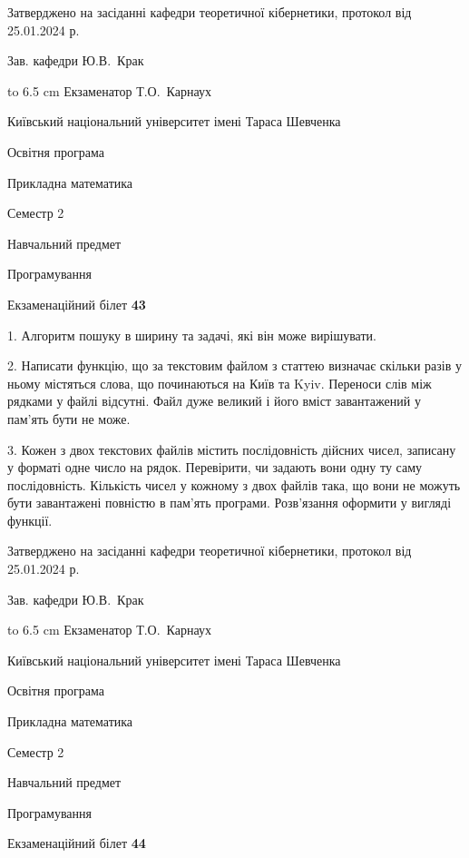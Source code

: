 \documentclass[12pt, ukrainian]{article}
\begin{document}
{\smallskip\smallskip \begin {scriptsize} Затверджено на засіданні кафедри теоретичної кібернетики, протокол   від   25.01.2024 р.\par\smallskip\smallskip\smallskip\smallskip
{\parbox {6.5 cm} {Зав. кафедри \dotfill Ю.В.~Крак}}\hspace {0.7cm} {\hbox to 6.5 cm { Екзаменатор \dotfill Т.О.~Карнаух}} \end{scriptsize}}
\newpage
{{\begin {scriptsize}\par
{ \center  Київський національний університет імені Тараса Шевченка \par}
{\parbox {5 cm}{Освітня програма \hfill}{\parbox {7 cm}{Прикладна математика\hfill}}\parbox {6 cm}{\hfill Семестр 2}}\par
{\parbox {5 cm} {Навчальний предмет \hfill}\parbox {7 cm}{Програмування \hfill}\parbox {6cm}{\hfill}\par}\vspace{-15pt} \end{scriptsize}}{\center Екзаменаційний білет \No \textbf { 43 }\par}}
{%
1. Алгоритм пошуку в ширину та задачі, які він може вирішувати.%
\par
2. Написати функцію, що за текстовим файлом з статтею визначає скільки разів у ньому містяться слова, що починаються на Київ та Kyiv.  Переноси слів між рядками у файлі відсутні. Файл дуже великий і його вміст завантажений у пам'ять бути не може.

\par
3. Кожен з двох текстових файлів містить послідовність дійсних чисел, записану у форматі одне число на рядок.  Перевірити, чи задають вони одну ту саму послідовність. Кількість чисел у кожному з двох файлів така, що вони не можуть бути завантажені повністю в пам'ять програми. Розв'язання оформити у вигляді функції.

}
{\smallskip\smallskip \begin {scriptsize} Затверджено на засіданні кафедри теоретичної кібернетики, протокол   від   25.01.2024 р.\par\smallskip\smallskip\smallskip\smallskip
{\parbox {6.5 cm} {Зав. кафедри \dotfill Ю.В.~Крак}}\hspace {0.7cm} {\hbox to 6.5 cm { Екзаменатор \dotfill Т.О.~Карнаух}} \end{scriptsize}}
\vspace{0.9cm}
{{\begin {scriptsize}\par
{ \center  Київський національний університет імені Тараса Шевченка \par}
{\parbox {5 cm}{Освітня програма \hfill}{\parbox {7 cm}{Прикладна математика\hfill}}\parbox {6 cm}{\hfill Семестр 2}}\par
{\parbox {5 cm} {Навчальний предмет \hfill}\parbox {7 cm}{Програмування \hfill}\parbox {6cm}{\hfill}\par}\vspace{-15pt} \end{scriptsize}}{\center Екзаменаційний білет \No \textbf { 44 }\par}}
\end{document}
